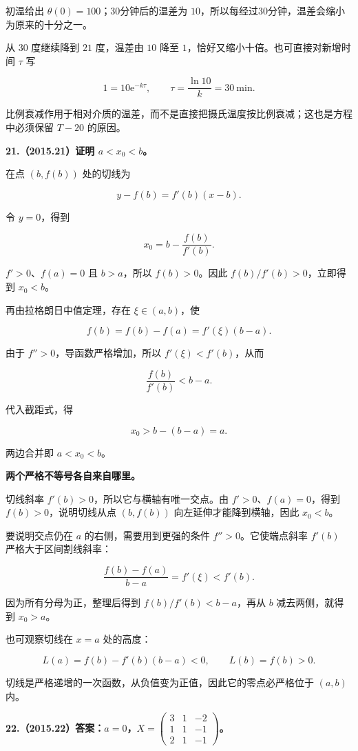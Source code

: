 \documentclass[UTF8,11pt,fontset=windows]{ctexart}
\begin{document}
初温给出 $\theta(0)=100$；30分钟后的温差为 $10$，所以每经过30分钟，温差会缩小为原来的十分之一。

从 $30$ 度继续降到 $21$ 度，温差由 $10$ 降至 $1$，恰好又缩小十倍。也可直接对新增时间 $\tau$ 写

$$
1=10\mathrm e^{-k\tau},
\qquad
\tau=\frac{\ln10}{k}=30\ \mathrm{min}.
$$

比例衰减作用于相对介质的温差，而不是直接把摄氏温度按比例衰减；这也是方程中必须保留 $T-20$ 的原因。

\clearpage

\textbf{21.（2015.21）证明 $a<x_0<b$。}

在点 $(b,f(b))$ 处的切线为

$$
y-f(b)=f'(b)(x-b).
$$

令 $y=0$，得到

$$
x_0=b-\frac{f(b)}{f'(b)}.
$$

$f'>0$、$f(a)=0$ 且 $b>a$，所以 $f(b)>0$。因此 $f(b)/f'(b)>0$，立即得到 $x_0<b$。

再由拉格朗日中值定理，存在 $\xi\in(a,b)$，使

$$
f(b)=f(b)-f(a)=f'(\xi)(b-a).
$$

由于 $f''>0$，导函数严格增加，所以 $f'(\xi)<f'(b)$，从而

$$
\frac{f(b)}{f'(b)}<b-a.
$$

代入截距式，得

$$
x_0>b-(b-a)=a.
$$

两边合并即 $a<x_0<b$。

\textbf{两个严格不等号各自来自哪里。}

切线斜率 $f'(b)>0$，所以它与横轴有唯一交点。由 $f'>0$、$f(a)=0$，得到 $f(b)>0$，说明切线从点 $(b,f(b))$ 向左延伸才能降到横轴，因此 $x_0<b$。

要说明交点仍在 $a$ 的右侧，需要用到更强的条件 $f''>0$。它使端点斜率 $f'(b)$ 严格大于区间割线斜率：

$$
\frac{f(b)-f(a)}{b-a}=f'(\xi)<f'(b).
$$

因为所有分母为正，整理后得到 $f(b)/f'(b)<b-a$，再从 $b$ 减去两侧，就得到 $x_0>a$。

也可观察切线在 $x=a$ 处的高度：

$$
L(a)=f(b)-f'(b)(b-a)<0,
\qquad L(b)=f(b)>0.
$$

切线是严格递增的一次函数，从负值变为正值，因此它的零点必严格位于 $(a,b)$ 内。

\clearpage

\textbf{22.（2015.22）答案：$a=0$，$X=\begin{pmatrix}3&1&-2\\1&1&-1\\2&1&-1\end{pmatrix}$。}
\end{document}
